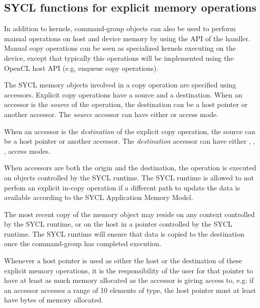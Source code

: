 %

\subsection{SYCL functions for explicit memory operations}
\label{subsec:explicitmemory}

In addition to \glspl{kernel}, \gls{command-group} objects can also be used to
perform manual operations on host and device memory by using the 
 API of the \gls{handler}.
Manual copy operations can be seen as specialized kernels executing on the 
device, except that typically this operations will be implemented using the
OpenCL host API (e.g, enqueue copy operations).

The SYCL memory objects involved in a copy operation are specified using
accessors.
Explicit copy operations have a source and a destination.
When an accessor is the \textit{source} of the operation, the destination can be 
a host pointer or another accessor.
The \textit{source} accessor can have either  or
 access mode.

When an accessor is the \textit{destination} of the explicit copy operation,
the source can be a host pointer or another accessor.
The \textit{destination} accessor can have either
, , ,
 access modes.

When accessors are both the origin and the destination,
the operation is executed on objects controlled by the SYCL runtime.
The SYCL runtime is allowed to not perfom an explicit in-copy operation
if a different path to update the data is available according to
the SYCL Application Memory Model.

The most recent copy of the memory object may reside on any context controlled
by the SYCL runtime, or on the host in a pointer controlled by the
SYCL runtime.  The SYCL runtime will ensure that data is copied to the destination
once the \gls{command-group} has completed execution.

Whenever a host pointer is used as either the host or the destination of these
explicit memory operations, it is the responsibility
of the user for that pointer to have at least as much memory allocated as
the accessor is giving access to, e.g: if an accessor accesses a range
of 10 elements of  type, the host pointer must at least have 
 bytes of memory allocated.

